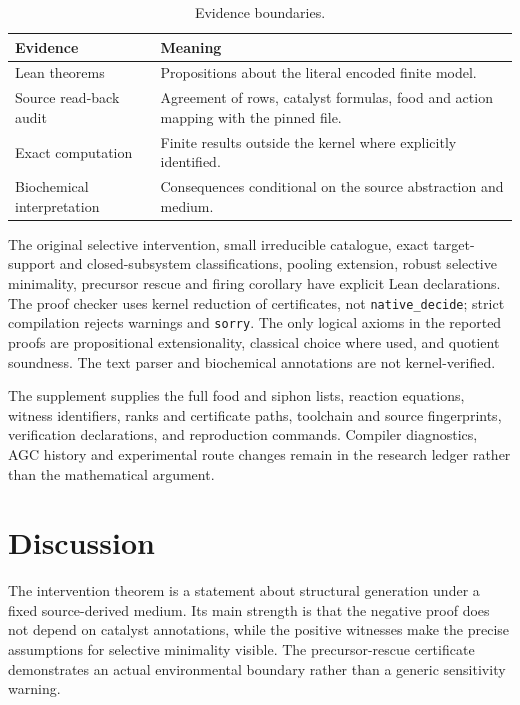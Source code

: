 \documentclass[11pt]{article}
\theoremstyle{definition}\newtheorem{definition}[theorem]{Definition}
\begin{document}
\begin{table}[tb]\centering
\caption{Evidence boundaries.}\label{tab:evidence}
\begin{tabularx}{\linewidth}{lX}\toprule
Evidence & Meaning\\\midrule
Lean theorems & Propositions about the literal encoded finite model.\\
Source read-back audit & Agreement of rows, catalyst formulas, food and action mapping with the pinned file.\\
Exact computation & Finite results outside the kernel where explicitly identified.\\
Biochemical interpretation & Consequences conditional on the source abstraction and medium.\\\bottomrule
\end{tabularx}\end{table}

The original selective intervention, small irreducible catalogue, exact target-support and closed-subsystem classifications, pooling extension, robust selective minimality, precursor rescue and firing corollary have explicit Lean declarations. The proof checker uses kernel reduction of certificates, not \texttt{native\_decide}; strict compilation rejects warnings and \texttt{sorry}. The only logical axioms in the reported proofs are propositional extensionality, classical choice where used, and quotient soundness. The text parser and biochemical annotations are not kernel-verified.



The supplement supplies the full food and siphon lists, reaction equations, witness identifiers, ranks and certificate paths, toolchain and source fingerprints, verification declarations, and reproduction commands. Compiler diagnostics, AGC history and experimental route changes remain in the research ledger rather than the mathematical argument.

\section{Discussion}
The intervention theorem is a statement about structural generation under a fixed source-derived medium. Its main strength is that the negative proof does not depend on catalyst annotations, while the positive witnesses make the precise assumptions for selective minimality visible. The precursor-rescue certificate demonstrates an actual environmental boundary rather than a generic sensitivity warning.
\end{document}
